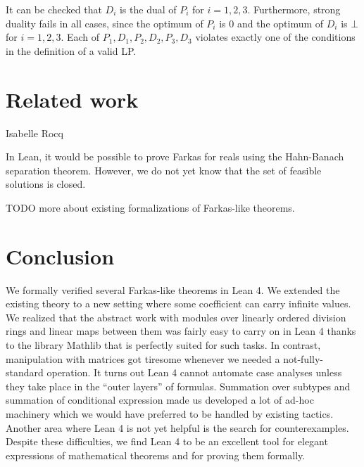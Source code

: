 \documentclass[]{article}
\renewcommand{\.}{\hskip .75pt}
\begin{document}
It can be checked that $D_i$ is the dual of $P_i$ for $i=1,2,3$.
Furthermore, strong duality fails in all cases, since
the optimum of $P_i$ is $0$ and the optimum of $D_i$ is $\bot$ for $i=1,2,3$.
Each of $P_1,D_1,P_2,D_2,P_3,D_3$ violates exactly one of the conditions
in the definition of a valid LP.














\section {Related work}

Isabelle \cite{Farkas-AFP} \cite{Linear-AFP} \cite{Duality-AFP}
Rocq \cite{Simplex-Coq}

In Lean, it would be possible to prove Farkas for reals using the
Hahn-Banach separation theorem. However, we do not yet know that
the set of feasible solutions is closed.

TODO more about existing formalizations of Farkas-like theorems.


\section {Conclusion}

We formally verified several Farkas-like theorems in Lean 4.
We extended the existing theory to a new setting where some
coefficient can carry infinite values. We realized that the
abstract work with modules over linearly ordered division rings
and linear maps between them was fairly easy to carry on in
Lean 4 thanks to the library Mathlib that is perfectly suited
for such tasks. In contrast, manipulation with matrices got
tiresome whenever we needed a not-fully-standard operation.
It turns out Lean 4 cannot automate case analyses unless they
take place in the ``outer layers'' of formulas. Summation
over subtypes and summation of conditional expression made
us developed a lot of ad-hoc machinery which we would have
preferred to be handled by existing tactics. Another area
where Lean 4 is not yet helpful is the search for counterexamples.
Despite these difficulties, we find Lean 4 to be an excellent
tool for elegant expressions of mathematical theorems and
for proving them formally.





\end{document}
